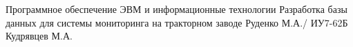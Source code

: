\documentclass{bmstu}
\begin{document}
                    {Программное обеспечение ЭВМ и информационные технологии}
                    {Разработка базы данных для системы мониторинга на тракторном 
заводе}
                    {Руденко М.А./ ИУ7-62Б}
                    {Кудрявцев М.А.}
                    {}
                    {}
                    {}

\setcounter{page}{3}

\maketableofcontents

%









\makebibliography


\end{document}

